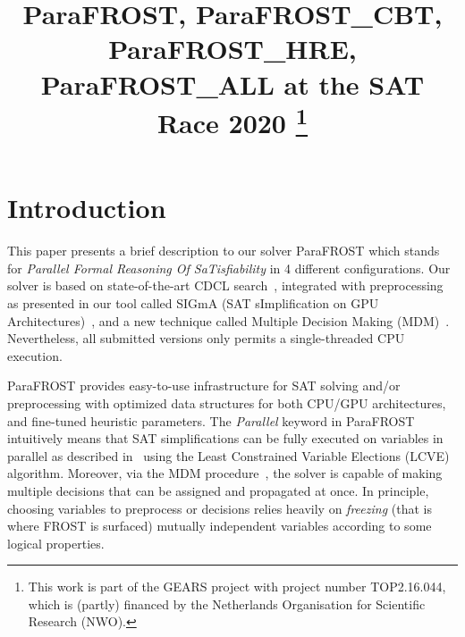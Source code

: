 \documentclass[conference]{IEEEtran}
\newcommand{\parafrost}{ParaFROST\xspace}
\begin{document}
\title{ParaFROST, ParaFROST\_CBT, ParaFROST\_HRE, ParaFROST\_ALL at the SAT Race 2020
\thanks{This work is part of the GEARS project with project number TOP2.16.044, which is (partly) financed by the Netherlands Organisation for Scientific Research (NWO).}
}

\author{
}

\maketitle

\section{Introduction}
This paper presents a brief description to our solver \parafrost which stands for \emph{Parallel Formal Reasoning Of SaTisfiability} in 4 different configurations. Our solver is based on state-of-the-art CDCL search~\cite{grasp,minisat,glucose}, integrated with preprocessing as presented in our tool called SIGmA (SAT sImplification on GPU Architectures)~\cite{sigmaTacas,sigmaIfm}, and a new technique called Multiple Decision Making (MDM)~\cite{pdcl}. Nevertheless, all submitted versions only permits a single-threaded CPU execution.

\parafrost provides easy-to-use infrastructure for SAT solving and/or preprocessing with optimized data structures for both CPU/GPU architectures, and fine-tuned heuristic parameters. The \emph{Parallel} keyword in \parafrost intuitively means that SAT simplifications can be fully executed on variables in parallel as described in~\cite{sigmaTacas} using the Least Constrained Variable Elections (LCVE) algorithm. Moreover, via the MDM procedure~\cite{pdcl}, the solver is capable of making multiple decisions that can be assigned and propagated at once. In principle, choosing variables to preprocess or decisions relies heavily on \emph{freezing} (that is where FROST is surfaced) mutually independent variables according to some logical properties. 
%
%
\end{document}
